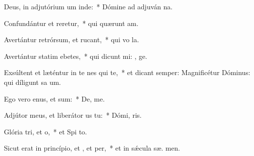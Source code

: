 \item Deus, in adjutórium um inde:~* Dómine ad adjuván  na.
\item Confundántur et reretur,~* qui quærunt  am.
\item Avertántur retrórsum, et rucant,~* qui vo  la.
\item Avertántur statim ebetes,~* qui dicunt mi: , ge.
\item Exsúltent et læténtur in te nes qui  te,~* et dicant semper: Magnificétur Dóminus: qui díligunt sa um.
\item Ego vero enus, et  sum:~* De,  me.
\item Adjútor meus, et liberátor us  tu:~* Dómi,  ris.
\item Glória tri, et o,~* et Spi to.
\item Sicut erat in princípio, et , et per,~* et in sǽcula sæ. men.
